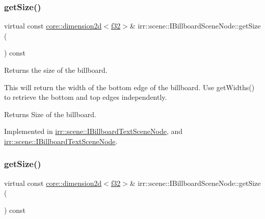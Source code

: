 \subsubsection{\texorpdfstring{get\+Size()}{getSize()}\hspace{0.1cm}{\footnotesize\ttfamily [1/4]}}
{\footnotesize\ttfamily virtual const \hyperlink{classirr_1_1core_1_1dimension2d}{core\+::dimension2d}$<$\hyperlink{namespaceirr_a0277be98d67dc26ff93b1a6a1d086b07}{f32}$>$\& irr\+::scene\+::\+I\+Billboard\+Scene\+Node\+::get\+Size (\begin{DoxyParamCaption}{ }\end{DoxyParamCaption}) const\hspace{0.3cm}{\ttfamily [pure virtual]}}



Returns the size of the billboard. 

This will return the width of the bottom edge of the billboard. Use get\+Widths() to retrieve the bottom and top edges independently. \begin{DoxyReturn}{Returns}
Size of the billboard. 
\end{DoxyReturn}


Implemented in \hyperlink{classirr_1_1scene_1_1IBillboardTextSceneNode_aead5178207d887357fb7f3fbddcc51d6}{irr\+::scene\+::\+I\+Billboard\+Text\+Scene\+Node}, and \hyperlink{classirr_1_1scene_1_1IBillboardTextSceneNode_aead5178207d887357fb7f3fbddcc51d6}{irr\+::scene\+::\+I\+Billboard\+Text\+Scene\+Node}.

\mbox{\label{classirr_1_1scene_1_1IBillboardSceneNode_a466cfd24ccb0fb6c2216dbdc7228e3c0}} 
\subsubsection{\texorpdfstring{get\+Size()}{getSize()}\hspace{0.1cm}{\footnotesize\ttfamily [2/4]}}
{\footnotesize\ttfamily virtual const \hyperlink{classirr_1_1core_1_1dimension2d}{core\+::dimension2d}$<$\hyperlink{namespaceirr_a0277be98d67dc26ff93b1a6a1d086b07}{f32}$>$\& irr\+::scene\+::\+I\+Billboard\+Scene\+Node\+::get\+Size (\begin{DoxyParamCaption}{ }\end{DoxyParamCaption}) const\hspace{0.3cm}{\ttfamily [pure virtual]}}



